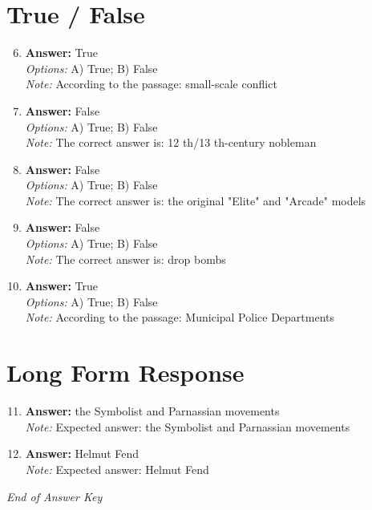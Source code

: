 \documentclass[12pt]{article}
\begin{document}
\section*{True / False}
\begin{enumerate}[label=\arabic*.]
\setcounter{enumi}{5}
\item \textbf{Answer:} True
\\ \textit{Options:} A) True; B) False
\\ \textit{Note:} According to the passage: small-scale conflict
\item \textbf{Answer:} False
\\ \textit{Options:} A) True; B) False
\\ \textit{Note:} The correct answer is: 12 th/13 th-century nobleman
\item \textbf{Answer:} False
\\ \textit{Options:} A) True; B) False
\\ \textit{Note:} The correct answer is: the original "Elite" and "Arcade" models
\item \textbf{Answer:} False
\\ \textit{Options:} A) True; B) False
\\ \textit{Note:} The correct answer is: drop bombs
\item \textbf{Answer:} True
\\ \textit{Options:} A) True; B) False
\\ \textit{Note:} According to the passage: Municipal Police Departments
\end{enumerate}

\section*{Long Form Response}
\begin{enumerate}[label=\arabic*.]
\setcounter{enumi}{10}
\item \textbf{Answer:} the Symbolist and Parnassian movements
\\ \textit{Note:} Expected answer: the Symbolist and Parnassian movements
\item \textbf{Answer:} Helmut Fend
\\ \textit{Note:} Expected answer: Helmut Fend
\end{enumerate}

\vfill
\noindent\textit{End of Answer Key}
\end{document}
